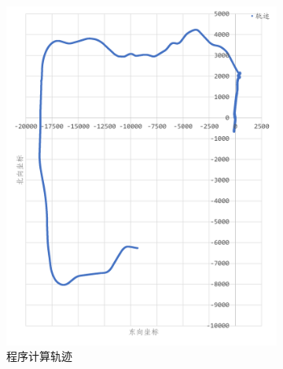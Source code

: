 \documentclass[10pt,a4paper]{ctexart}
\begin{document}
\begin{figure}[H]
    \centering
    {
        \begin{subfigure}{0.49\textwidth}
            \centering
            \includegraphics[width=\linewidth]{Figures/DataFigure/示例数据解算轨迹.png}
            \caption*{程序计算轨迹}
        \end{subfigure}\hfill
        \begin{subfigure}{0.49\textwidth}
            \centering

\end{subfigure}}
\end{figure}
\end{document}
